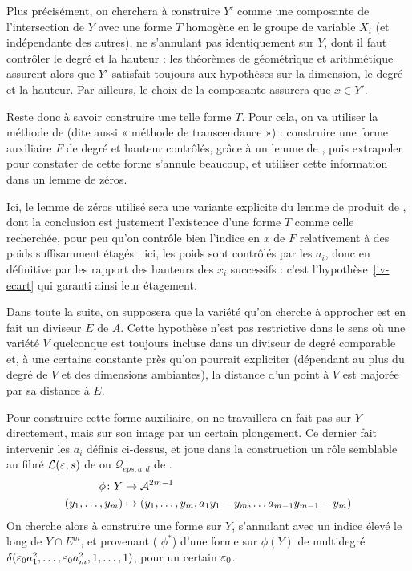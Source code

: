 Plus précisément, on cherchera à construire $Y'$ comme une composante de
l'intersection de $Y$ avec une forme $T$ homogène en le groupe de variable
$X_i$ (et indépendante des autres), ne s'annulant pas identiquement sur $Y$,
dont il faut contrôler le degré et la hauteur : les théorèmes de 
géométrique et arithmétique assurent alors que $Y'$ satisfait toujours aux
hypothèses sur la dimension, le degré et la hauteur. Par ailleurs, le choix de
la composante assurera que $x \in Y'$.

Reste donc à savoir construire une telle forme $T$. Pour cela, on va utiliser
la méthode de  (dite aussi « méthode de transcendance ») :
construire une forme auxiliaire $F$ de degré et hauteur contrôlés, grâce à un
lemme de , puis extrapoler pour constater de cette forme s'annule
beaucoup, et utiliser cette information dans un lemme de zéros.

Ici, le lemme de zéros utilisé sera une variante explicite du lemme de produit
de , dont la conclusion est justement l'existence d'une forme
$T$ comme celle recherchée, pour peu qu'on contrôle bien l'indice en $x$ de
$F$ relativement à des poids suffisamment étagés : ici, les poids sont
contrôlés par les $a_i$, donc en définitive par les rapport des hauteurs des
$x_i$ successifs : c'est l'hypothèse~\ref{iv-ecart} qui garanti ainsi leur
étagement.

Dans toute la suite, on supposera que la variété qu'on cherche à approcher est
en fait un diviseur $E$ de $A$. Cette hypothèse n'est pas restrictive dans le
sens où une variété $V$ quelconque est toujours incluse dans un diviseur de
degré comparable et, à une certaine constante près qu'on pourrait expliciter
(dépendant au plus du degré de $V$ et des dimensions ambiantes), la distance
d'un point à $V$ est majorée par sa distance à $E$.

Pour construire cette forme auxiliaire, on ne travaillera en fait pas sur $Y$
directement, mais sur son image par un certain plongement. Ce dernier fait
intervenir les $a_i$ définis ci-dessus, et joue dans la construction un rôle
semblable au fibré $\mathcal L(\varepsilon, s)$ de \cite{falda} ou $\mathcal Q_{eps,
  a, d}$ de \cite{remivds}.
\begin{align*}
  \phi \colon Y & \to \mathcal A^{2m-1} \\
  (y_1, \dots, y_m)  & \mapsto
  (y_1, \dots, y_m, a_1 y_1 - y_m, \dots a_{m-1} y_{m-1} - y_m)
\end{align*}
On cherche alors à construire une forme sur $Y$, s'annulant avec un indice
élevé le long de $Y \cap E^m$, et provenant ( $\phi^*$) d'une forme
sur $\phi(Y)$ de multidegré $\delta(\varepsilon_0 a_1^2, \dots, \varepsilon_0 a_m^2, 1,
\dots, 1)$, pour un certain $\varepsilon_0$.

